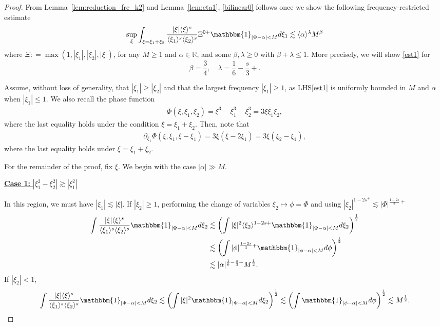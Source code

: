 \documentclass[%
11pt,  reqno]{amsart}
\newcommand{\fia}{\mathbbm{1}_{|\Phi-\alpha|<M}}
\newcommand{\jap}[1]{\langle #1 \rangle}
\newcommand{\5}{\textup{V}}
\newcommand{\noi}{\noindent}
\theoremstyle{remark}
\newcommand{\R}{\mathbb{R}}
\newcommand{\al}{\alpha}
\newcommand{\be}{\beta}
\newcommand{\ld}{\lambda}
\numberwithin{equation}{section}
\numberwithin{theorem}{section}
\begin{document}
\begin{proof}%


From Lemma~\ref{lem:reduction_fre_k2} and Lemma~\ref{lem:eta1}, \eqref{bilinear0} follows once we show the following frequency-restricted estimate
\begin{equation}
\label{est1}
\sup_{\xi} \int_{\xi=\xi_1+\xi_2}
\frac{|\xi|\jap{\xi}^s}{\jap{\xi_1}^s\jap{\xi_2}^s}
\Xi^{0+}
\fia d\xi_1
\lesssim 
\jap{\al}^{\ld } M^{\be} 
\end{equation}
where $\Xi : = \max(1, |\xi_1|, |\xi_2|, |\xi|)$, 
for any $M\ge 1$ and $\al\in\R$, and some $\be,\ld \ge 0$ with $\be+\ld \le 1$. More precisely, we will show \eqref{est1} for
$$
\beta=\frac34,\quad \lambda=\frac{1}{6}-\frac s3+. 
$$


Assume, without loss of generality, that $|\xi_1|\ge |\xi_2|$ and that the largest frequency $|\xi_1| \ge 1$, as LHS\eqref{est1} is uniformly bounded in $M$ and $\al$ when $|\xi_1| \le 1$. We also recall the phase function 
\begin{align}
\label{phase2}
\Phi (\xi, \xi_1, \xi_2) = \xi^3 - \xi_1^3 - \xi_2^3 = 3 \xi \xi_1 \xi_2, 
\end{align}
where the last equality holds under the condition $\xi= \xi_1 + \xi_2$. Then, note that
\begin{align}
\label{phase2a}
\partial_{\xi_1} \Phi(\xi, \xi_1,\xi-\xi_1) 
= 
3 \xi (\xi -2 \xi_1)
= 
3 \xi(\xi_2 - \xi_1)
, 
\end{align}
where the last equality holds under $\xi = \xi_1+\xi_2$. 



For the remainder of the proof, fix $\xi$. We begin with the case $|\alpha|\gg M$.

\smallskip

\noi
\underline{
\textbf{Case 1:} $|\xi_1^2-\xi_2^2| \gtrsim |\xi_1^2|$}

In this region, we must have $|\xi_1|\lesssim |\xi|$. If $|\xi_2|\ge 1$, performing the change of variables $\xi_2\mapsto \phi=\Phi$ and using $|\xi_2|^{1-2s^+}\lesssim |\Phi|^{\frac{1-2s}{3}+}$
\begin{align*}
     \int \frac{|\xi|\jap{\xi}^s}{\jap{\xi_1}^s\jap{\xi_2}^s}\fia d\xi_2 &\lesssim \left(\int |\xi|^2\jap{\xi_2}^{1-2s+}\fia d\xi_2\right)^\frac12\\&\lesssim \left(\int |\phi|^{\frac{1-2s}{3}+}\mathbbm{1}_{|\phi-\alpha|<M} d\phi\right)^\frac12\\&\lesssim |\alpha|^{\frac16 - \frac s3 +} M^{\frac12}.
\end{align*}
If $|\xi_2|<1$,
\begin{align*}
     \int \frac{|\xi|\jap{\xi}^s}{\jap{\xi_1}^s\jap{\xi_2}^s}\fia d\xi_2 \lesssim \left(\int |\xi|^2\fia d\xi_2\right)^\frac12\lesssim \left(\int \mathbbm{1}_{|\phi-\alpha|<M} d\phi\right)^\frac12\lesssim M^{\frac12}.
\end{align*}


\end{proof}
\end{document}
